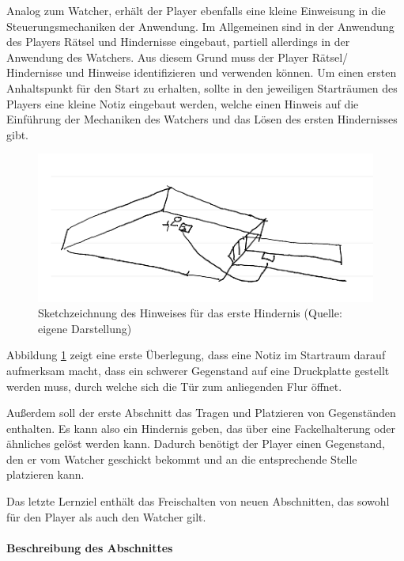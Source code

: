 Analog zum Watcher, erhält der Player ebenfalls eine kleine Einweisung in die Steuerungsmechaniken der Anwendung. Im Allgemeinen sind in der Anwendung des Players Rätsel und Hindernisse eingebaut, partiell allerdings in der Anwendung des Watchers. Aus diesem Grund muss der Player Rätsel/ Hindernisse und Hinweise identifizieren und verwenden können. Um einen ersten Anhaltspunkt für den Start zu erhalten, sollte in den jeweiligen Starträumen des Players eine kleine Notiz eingebaut werden, welche einen Hinweis auf die Einführung der Mechaniken des Watchers und das Lösen des ersten Hindernisses gibt.
\begin{figure}[ht]
\centering
\includegraphics[width=1\linewidth]{content/pictures/Startroom_Sketch.png}
\caption{Sketchzeichnung des Hinweises für das erste Hindernis (Quelle: eigene Darstellung)}
\label{fig:sketch-startriddle}
\end{figure}

Abbildung \ref{fig:sketch-startriddle} zeigt eine erste Überlegung, dass eine Notiz im Startraum darauf aufmerksam macht, dass ein schwerer Gegenstand auf eine Druckplatte gestellt werden muss, durch welche sich die Tür zum anliegenden Flur öffnet.

Außerdem soll der erste Abschnitt das Tragen und Platzieren von Gegenständen enthalten. Es kann also ein Hindernis geben, das über eine Fackelhalterung oder ähnliches gelöst werden kann. Dadurch benötigt der Player einen Gegenstand, den er vom Watcher geschickt bekommt und an die entsprechende Stelle platzieren kann.

Das letzte Lernziel enthält das Freischalten von neuen Abschnitten, das sowohl für den Player als auch den Watcher gilt.

\paragraph{Beschreibung des Abschnittes}

